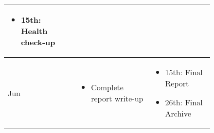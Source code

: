 \begin{figure}
\begin{tabular}{l|p{}|p{}}
\begin{itemize}
\item 15th: Health check-up
\end{itemize}\\
\hline
Jun & \begin{itemize}
\item Complete report write-up
\end{itemize} & \begin{itemize}
\item 15th: Final Report
\item 26th: Final Archive
\end{itemize}
\end{tabular}
\label{table:timetable}
\end{figure}
